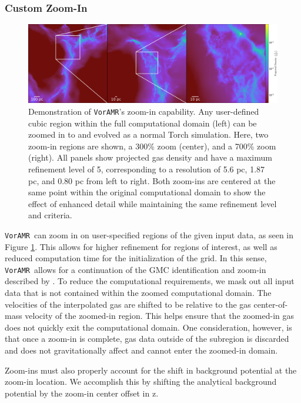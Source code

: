 \documentclass[twoside]{drexel-thesis}
\newcommand\voramr{\texttt{VorAMR}}
\begin{document}
\begin{thesis}
\subsubsection{Custom Zoom-In}

\begin{figure}[!htb]
    \centering
    \includegraphics[width=0.99\linewidth
    ]{stacked_h_zoom_guidelines.png}
    \caption{Demonstration of \voramr's zoom-in capability. Any user-defined cubic region within the full computational domain (left) can be zoomed in to and evolved as a normal Torch simulation. Here, two zoom-in regions are shown, a 300\% zoom (center), and a 700\% zoom (right). All panels show projected gas density and have a maximum refinement level of 5, corresponding to a resolution of 5.6 pc, 1.87 pc, and 0.80 pc from left to right. Both zoom-ins are centered at the same point within the original computational domain to show the effect of enhanced detail while maintaining the same refinement level and criteria.}
    \label{fig:zoomin}
\end{figure}
\voramr~can zoom in on user-specified regions of the given input data, as seen in Figure \ref{fig:zoomin}. This allows for higher refinement for regions of interest, as well as reduced computation time for the initialization of the grid. In this sense, \voramr~allows for a continuation of the GMC identification and zoom-in described by \citet{li_effects_2020}. To reduce the computational requirements, we mask out all input data that is not contained within the zoomed computational domain. The velocities of the interpolated gas are shifted to be relative to the gas center-of-mass velocity of the zoomed-in region. This helps ensure that the zoomed-in gas does not quickly exit the computational domain. One consideration, however, is that once a zoom-in is complete, gas data outside of the subregion is discarded and does not gravitationally affect and cannot enter the zoomed-in domain.

Zoom-ins must also properly account for the shift in background potential at the zoom-in location. We accomplish this by shifting the analytical background potential by the zoom-in center offset in z.


\end{thesis}
\end{document}
